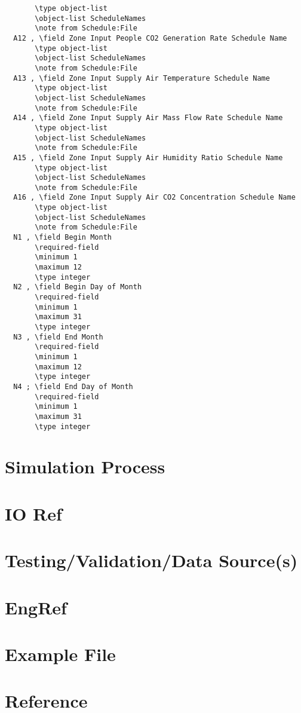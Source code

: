 \documentclass[11pt]{article}
\begin{document}
\begin{verbatim}
       \type object-list
       \object-list ScheduleNames
       \note from Schedule:File
  A12 , \field Zone Input People CO2 Generation Rate Schedule Name
       \type object-list
       \object-list ScheduleNames
       \note from Schedule:File
  A13 , \field Zone Input Supply Air Temperature Schedule Name
       \type object-list
       \object-list ScheduleNames
       \note from Schedule:File
  A14 , \field Zone Input Supply Air Mass Flow Rate Schedule Name
       \type object-list
       \object-list ScheduleNames
       \note from Schedule:File
  A15 , \field Zone Input Supply Air Humidity Ratio Schedule Name
       \type object-list
       \object-list ScheduleNames
       \note from Schedule:File
  A16 , \field Zone Input Supply Air CO2 Concentration Schedule Name
       \type object-list
       \object-list ScheduleNames
       \note from Schedule:File
  N1 , \field Begin Month
       \required-field
       \minimum 1
       \maximum 12
       \type integer
  N2 , \field Begin Day of Month
       \required-field
       \minimum 1
       \maximum 31
       \type integer
  N3 , \field End Month
       \required-field
       \minimum 1
       \maximum 12
       \type integer
  N4 ; \field End Day of Month
       \required-field
       \minimum 1
       \maximum 31
       \type integer

\end{verbatim}

\section{Simulation Process}

\section{IO Ref}

\section{Testing/Validation/Data Source(s)}

\section{EngRef}

\section{Example File}

\section{Reference}
\end{document}
